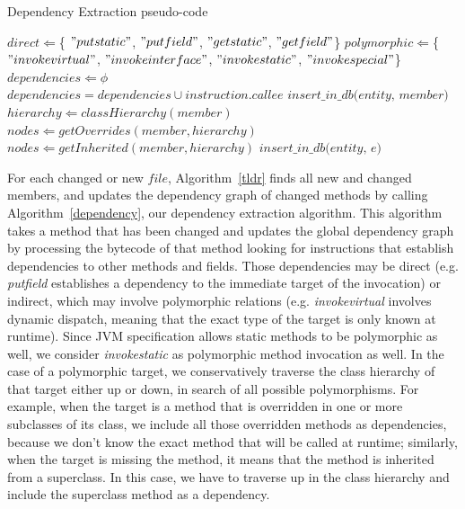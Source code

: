 \begin{algorithm}
{\fontsize{12pt}{12pt}\selectfont

\caption{Dependency Extraction pseudo-code}
  \label{dependency}
  \begin{algorithmic}[1]


\State $direct \Leftarrow $\{ $"putstatic"$, $"putfield"$, $"getstatic"$, $"getfield"$\}
\State $polymorphic \Leftarrow $\{$"invokevirtual"$, $"invokeinterface"$, $"invokestatic"$, $"invokespecial"$\}
\State $dependencies \Leftarrow \phi$\\

         \State $dependencies = dependencies \cup instruction.callee$ 
     \EndIf
\EndFor
{}
        \State $ \textit{insert\_in\_db(entity, member)}$
        \State $hierarchy \Leftarrow classHierarchy(member)$
            \State $nodes \Leftarrow getOverrides(member, hierarchy)$ 
            \State $nodes \Leftarrow getInherited(member, hierarchy)$ 
        \EndIf
        \State $ \textit{insert\_in\_db(entity, e)}$
        \EndFor
    \EndIf
\EndFor

\EndFunction
\end{algorithmic}
}
\end{algorithm}
\medskip

For each changed or new $file$, Algorithm~\ref{tldr} finds all new and changed members, and updates the dependency graph of changed methods by calling Algorithm~\ref{dependency}, our dependency extraction algorithm. This algorithm takes a method that has been changed and updates the global dependency graph by processing the bytecode of that method looking for instructions that establish dependencies to other methods and fields. Those dependencies may be direct (e.g. {\em putfield} establishes a dependency to the immediate target of the invocation) or indirect, which may involve polymorphic relations (e.g. {\em invokevirtual} involves dynamic dispatch, meaning that the exact type of the target is only known at runtime). Since JVM specification allows static methods to be polymorphic as well, we consider  {\em invokestatic} as polymorphic method invocation as well. In the case of a polymorphic target, we conservatively traverse the class hierarchy of that target either up or down, in search of all possible polymorphisms. For example, when the target is a method that is overridden in one or more subclasses of its class, we include all those overridden methods as dependencies, because we don't know the exact method that will be called at runtime; similarly, when the target is missing the method, it means that the method is inherited from a superclass. In this case, we have to traverse up in the class hierarchy and include the superclass method as a dependency.

